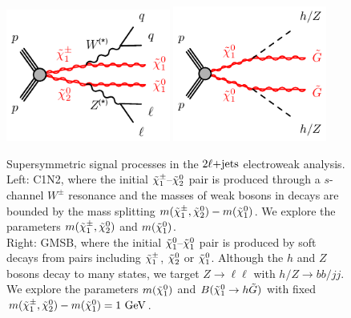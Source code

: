 \begin{figure}[t]
\centering
\includegraphics[width=0.48\textwidth]{figures/2ljets_c1n2_llqqn1n1_wz.pdf}
\hfill
\includegraphics[width=0.45\textwidth]{figures/2ljets_n1n1_hhggzz.pdf}
\caption{%
Supersymmetric signal processes in the $\twoljets$ electroweak analysis.
\\[0.5em]
Left: C1N2, where the initial $\chargino{1}\textrm{--}\neutralino{2}$ pair
is produced through a $s$-channel $W^{\pm}$ resonance and the masses of
weak bosons in decays are bounded by the mass splitting
$m(\chargino{1}, \neutralino{2}) - m(\neutralino{1})$.
We explore the parameters
$m(\chargino{1}, \neutralino{2})$ and $m(\neutralino{1})$.
\\[0.5em]
Right: GMSB, where the initial $\neutralino{1}\textrm{--}\neutralino{1}$ pair
is produced by soft decays from pairs including $\chargino{1}$,
$\neutralino{2}$ or $\neutralino{1}$.
Although the $h$ and $Z$ bosons decay to many states, we target
$Z\rightarrow \ell\ell$ with
$h/Z\rightarrow bb/jj$.
We explore the parameters
$m(\neutralino{1})$ and $B(\neutralino{1} \rightarrow h \tilde{G})$ with fixed
$m(\chargino{1}, \neutralino{2}) - m(\neutralino{1}) = 1~\eV[G]$.
}
\label{fig:2ljets_signal_diagrams}
\end{figure}




